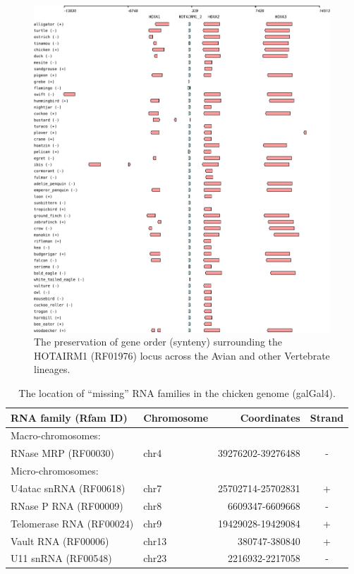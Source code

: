\documentclass[10pt]{bmc_article}
\newenvironment{bmcformat}{\begin{raggedright}\baselineskip20pt\sloppy\setboolean{publ}{false}}{\end{raggedright}\baselineskip20pt\sloppy}
\begin{document}
\begin{bmcformat}
\begin{figure}[ht]
\includegraphics[width=0.99\textwidth]{figures/HOTAIR_loci_synteny.pdf}
  \caption[]{The preservation of gene order (synteny) surrounding the
    HOTAIRM1 (RF01976) locus across the Avian and other Vertebrate
    lineages.}\label{fig:16}
\end{figure}

\clearpage
\newpage

\begin{table}[h!]
  \begin{center}
    \begin{tabular}{|l|l|r|c|}
    \hline
RNA family (Rfam ID) & Chromosome & Coordinates & Strand \\
    \hline
\multicolumn{4}{|l|}{Macro-chromosomes:}\\
RNase MRP (RF00030)     & chr4 & 39276202-39276488 & -\\
\multicolumn{4}{|l|}{Micro-chromosomes:}\\ 
U4atac snRNA (RF00618)  & chr7 &	25702714-25702831 & +\\
RNase P RNA (RF00009)   & chr8 & 6609347-6609668   & -\\
Telomerase RNA (RF00024)& chr9 & 19429028-19429084 & +\\
Vault RNA (RF00006)     & chr13& 380747-380840     & +\\
U11 snRNA (RF00548)     & chr23& 2216932-2217058   & -\\
\hline
    \end{tabular}
  \end{center}
  \caption{The location of ``missing'' RNA families in the chicken genome (galGal4). }
\end{table}



\end{bmcformat}
\end{document}
